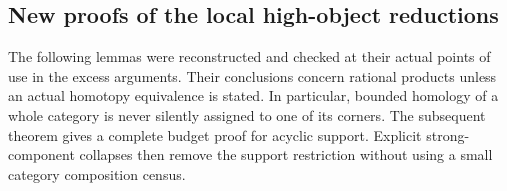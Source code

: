 \subsection{New proofs of the local high-object reductions}
\label{CP2:A-high-local}
The following lemmas were reconstructed and checked at their actual
points of use in the excess arguments.  Their conclusions concern
rational products unless an actual homotopy equivalence is stated.
In particular, bounded homology of a whole category is never silently
assigned to one of its corners.  The subsequent theorem gives a
complete budget proof for acyclic support.  Explicit strong-component
collapses then remove the support restriction without using a small
category composition census.











































